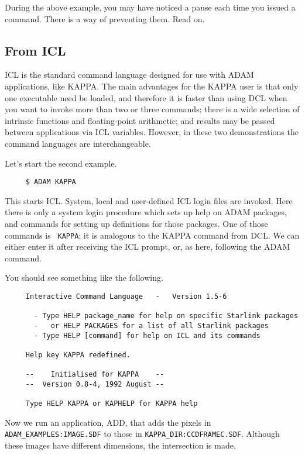During the above example, you may have noticed a pause each time you
issued a command.  There is a way of preventing them.  Read on.

\subsection{From ICL}
{\small ICL} is the standard command language designed for use with
{\small ADAM} applications, like {\small KAPPA}.  The main advantages
for the {\small KAPPA} user is that only one executable need be loaded,
and therefore it is faster than using {\small DCL} when you want to invoke
more than two or three commands; there is a wide selection of intrinsic
functions and floating-point arithmetic; and results may be passed
between applications via {\small ICL} variables.  However, in these two
demonstrations the command languages are interchangeable.

Let's start the second example.

\small
\begin{verbatim}
     $ ADAM KAPPA
\end{verbatim}
\normalsize

This starts {\small ICL}.  System, local and user-defined {\small ICL}
login files are invoked.  Here there is only a system login procedure
which sets up help on {\small ADAM} packages, and commands for setting
up definitions for those packages.  One of those commands is {\tt
KAPPA}; it is analogous to the KAPPA command from {\small DCL}.
We can either enter it after receiving the {\small ICL} prompt,
or, as here, following the ADAM command.

You should see something like the following.

\small
\begin{verbatim}
     Interactive Command Language   -   Version 1.5-6

       - Type HELP package_name for help on specific Starlink packages
       -   or HELP PACKAGES for a list of all Starlink packages
       - Type HELP [command] for help on ICL and its commands

     Help key KAPPA redefined.

     --    Initialised for KAPPA    --
     --  Version 0.8-4, 1992 August --

     Type HELP KAPPA or KAPHELP for KAPPA help

\end{verbatim}
\normalsize

Now we run an application, ADD, that adds the pixels in
{\tt ADAM\_EXAMPLES:IMAGE.SDF} to those in {\tt KAPPA\_DIR:CCDFRAMEC.SDF}.
Although these images have different dimensions, the intersection is
made.


